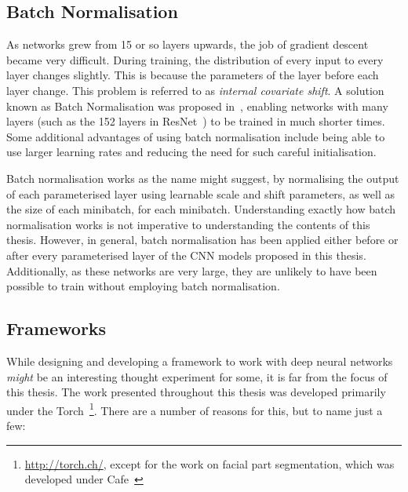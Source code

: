 

\subsection{Batch Normalisation}

As networks grew from 15 or so layers upwards, the job of gradient
descent became very difficult. During training, the distribution of
every input to every layer changes slightly. This is because the
parameters of the layer before each layer change. This problem is
referred to as \textit{internal covariate shift}. A solution known as
Batch Normalisation was proposed in~\cite{ioffe2015batch}, enabling
networks with many layers (such as the 152 layers in
ResNet~\cite{he2015deep}) to be trained in much shorter times. Some
additional advantages of using batch normalisation include being able
to use larger learning rates and reducing the need for such careful
initialisation.

Batch normalisation works as the name might suggest, by normalising
the output of each parameterised layer using learnable scale and shift
parameters, as well as the size of each minibatch, for each
minibatch. Understanding exactly how batch normalisation works is not
imperative to understanding the contents of this thesis. However, in
general, batch normalisation has been applied either before or after
every parameterised layer of the CNN models proposed in this
thesis. Additionally, as these networks are very large, they are
unlikely to have been possible to train without employing batch
normalisation.


\subsection{Frameworks}

While designing and developing a framework to work with deep neural
networks \textit{might} be an interesting thought experiment for some,
it is far from the focus of this thesis. The work presented throughout
this thesis was developed primarily under the
Torch~\footnote{\url{http://torch.ch/}, except for the work on facial
  part segmentation, which was developed under
  Cafe~\cite{jia2014caffe}}. There are a number of reasons for this,
but to name just a few:

